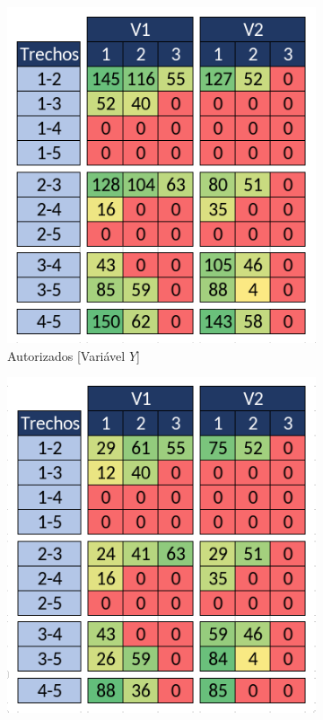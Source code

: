 \begin{figure}[h!]
	\centering
	\begin{subfigure}[b]{0.35\linewidth}
		\includegraphics[width=\linewidth]{img/exemplo1.png}
		\caption{Autorizados [Variável $Y$]}
		\label{fig:auto_assig_a}
	\end{subfigure}\hspace{5mm}
	\begin{subfigure}[b]{0.35\linewidth}
		\includegraphics[width=\linewidth]{img/exemplo2.png}

\end{subfigure}
\end{figure}
